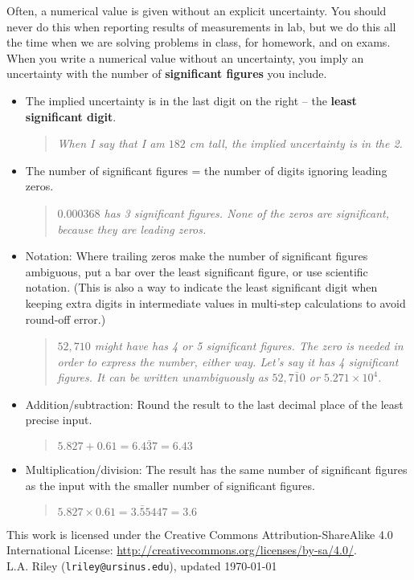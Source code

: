 \documentclass[12pt]{article}
\begin{document}
Often, a numerical value is given without an explicit uncertainty. You
should never do this when reporting results of measurements in lab,
but we do this all the time when we are solving problems in class, for
homework, and on exams. When you write a numerical value without an
uncertainty, you imply an uncertainty with the number of
\textbf{significant figures} you include.
\begin{itemize}
\item The implied uncertainty is in the last digit on the right -- the
  \textbf{least significant digit}.
  \begin{quote}
    \textit{When I say that I am $182$ cm tall, the implied uncertainty
      is in the 2.}
  \end{quote}

\item The number of significant figures = the number of digits
  ignoring leading zeros.
  \begin{quote}
    \textit{$0.000368$ has 3 significant figures. None of the zeros
      are significant, because they are leading zeros.}
  \end{quote}

\item Notation: Where trailing zeros make the number of significant
  figures ambiguous, put a bar over the least significant figure, or
  use scientific notation. (This is also a way to indicate the least
  significant digit when keeping extra digits in intermediate values
  in multi-step calculations to avoid round-off error.)
  \begin{quote}
    \textit{$52,710$ might have has 4 or 5 significant figures. The zero
      is needed in order to express the number, either way. Let's say
      it has 4 significant figures. It can be written unambiguously
      as $52,7\bar{1}0$ or $5.271 \times 10^4$.} 
  \end{quote}

\item Addition/subtraction: Round the result to the last decimal place
  of the least precise input.
  \begin{quote}
    \textit{$5.827 + 0.61 = 6.4\bar{3}7 = 6.43$}
  \end{quote}
  
\item Multiplication/division: The result has the same number of
  significant figures as the input with the smaller number of
  significant figures.
  \begin{quote}
    \textit{$5.827 \times 0.61 = 3.\bar{5}5447 = 3.6$}
  \end{quote}
  
\end{itemize}

{\footnotesize
  \noindent
  \hrulefill
  
  \noindent
  This work is licensed under the Creative Commons
  Attribution-ShareAlike 4.0 International License: 
  \url{http://creativecommons.org/licenses/by-sa/4.0/}.\\

  \noindent
  L.A. Riley (\texttt{lriley@ursinus.edu}), updated \today
}
\end{document}
